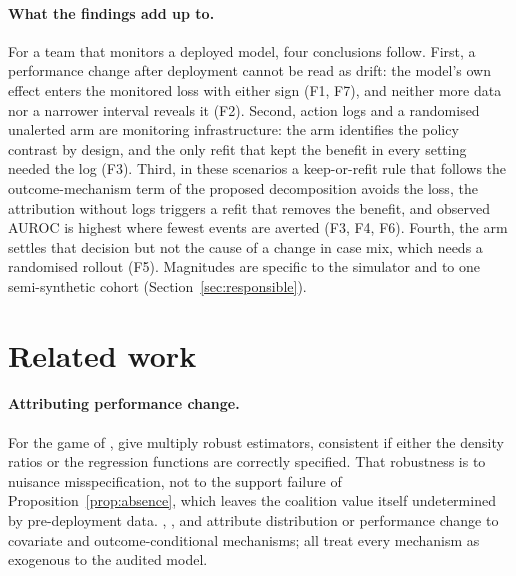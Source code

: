 \documentclass[letterpaper]{article} %
\begin{document}
\paragraph{What the findings add up to.} For a team that monitors a deployed
model, four conclusions follow. First, a performance change after deployment
cannot be read as drift: the model's own effect enters the monitored loss
with either sign (F1, F7), and neither more data nor a narrower interval
reveals it (F2). Second, action logs and a randomised unalerted arm are
monitoring infrastructure: the arm identifies the policy
contrast by design, and the only refit that kept the benefit in every
setting needed the log (F3). Third, in these scenarios a keep-or-refit rule that follows the
outcome-mechanism term of the proposed decomposition avoids the loss, the
attribution without logs triggers a refit that removes the benefit, and
observed AUROC is highest where fewest events are averted (F3, F4, F6). Fourth, the arm settles that decision but
not the cause of a change in case mix, which needs a randomised rollout (F5).
Magnitudes are specific to the simulator and to one semi-synthetic cohort
(Section~\ref{sec:responsible}).

\section{Related work}
\label{sec:related}

\paragraph{Attributing performance change.} For the game of \citet{zhang2023attributing},
\citet{quintasmartinez2024multiply} give multiply robust estimators, consistent if either the density
ratios or the regression functions are correctly specified. That robustness
is to nuisance misspecification, not to the support failure of
Proposition~\ref{prop:absence}, which leaves the coalition value itself
undetermined by pre-deployment data. \citet{budhathoki2021rootcauses},
\citet{cai2023disde}, \citet{singh2024hierarchical} and
\citet{gordaliza2025causal} attribute distribution or performance change to
covariate and outcome-conditional mechanisms; all treat every mechanism as
exogenous to the audited model.
\end{document}

